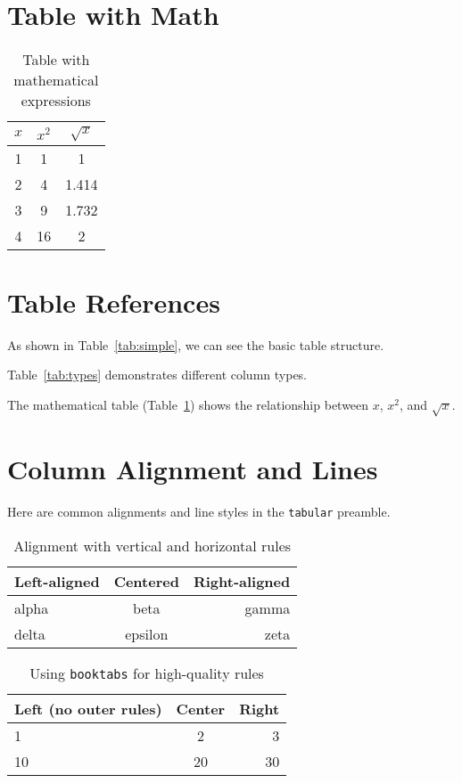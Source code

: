 \documentclass{article}
\begin{document}
\section{Table with Math}
\begin{table}[h]
\centering
\begin{tabular}{|c|c|c|}
\hline
$x$ & $x^2$ & $\sqrt{x}$ \\
\hline
1 & 1 & 1 \\
2 & 4 & 1.414 \\
3 & 9 & 1.732 \\
4 & 16 & 2 \\
\hline
\end{tabular}
\caption{Table with mathematical expressions}
\label{tab:math}
\end{table}

\section{Table References}
As shown in Table~\ref{tab:simple}, we can see the basic table structure.

Table~\ref{tab:types} demonstrates different column types.

The mathematical table (Table~\ref{tab:math}) shows the relationship between $x$, $x^2$, and $\sqrt{x}$.


\clearpage
\section{Column Alignment and Lines}
Here are common alignments and line styles in the \texttt{tabular} preamble.

\begin{table}[htbp]
\centering
\begin{tabular}{|l|c|r|}
\hline
Left-aligned & Centered & Right-aligned \\
\hline
alpha & beta & gamma \\
delta & epsilon & zeta \\
\hline
\end{tabular}
\caption{Alignment with vertical and horizontal rules}
\label{tab:alignment-lines}
\end{table}

\begin{table}[htbp]
\centering
\begin{tabular}{@{} l c r @{}}
\toprule
Left (no outer rules) & Center & Right \\
\midrule
1 & 2 & 3 \\
10 & 20 & 30 \\
\bottomrule
\end{tabular}
\caption{Using \texttt{booktabs} for high-quality rules}
\label{tab:booktabs}
\end{table}
\end{document}
